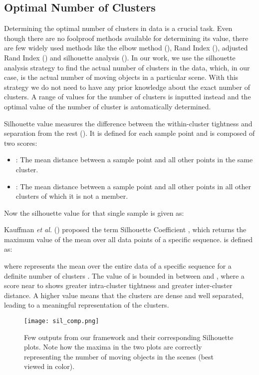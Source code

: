 \documentclass{article}
\begin{document}
\subsection{Optimal Number of Clusters}
Determining the optimal number of clusters in data is a crucial task. Even though there are no foolproof methods available for determining its value, there are few widely used methods like the elbow method (\cite{syakur2018integration}), Rand Index (\cite{santos2009use}), adjusted Rand Index (\cite{hubert1985comparing}) and silhouette analysis (\cite{shutaywi2021silhouette}). In our work, we use the silhouette analysis strategy to find the actual number of clusters in the data, which, in our case, is the actual number of moving objects in a particular scene. With this strategy we do not need to have any prior knowledge about the exact number of clusters. A range of values for the number of clusters is inputted instead and the optimal value of the number of cluster is automatically determined. 

Silhouette value measures the difference between the within-cluster tightness and separation from the rest (\cite{rousseeuw_2002}). It is defined for each sample point and is composed of two scores:
\begin{itemize}[leftmargin=*]
    \itemsep0em
    \item : The mean distance between a sample point  and all other points in the same cluster.
    \item : The mean distance between a sample point  and all other points in all other clusters of which it is not a member.
\end{itemize}
Now the silhouette value  for that single sample is given as:


Kauffman \textit{et al.} (\cite{kaufman_rousseeuw_1990}) proposed the term Silhouette Coefficient , which returns the maximum value of the mean  over all data points of a specific sequence.  is defined as:

where  represents the mean  over the entire data of a specific sequence for a definite number of clusters .   
The value of  is bounded in between  and , where a score near to  shows greater intra-cluster tightness and greater inter-cluster distance. A higher value means that the clusters are dense and well separated, leading to a meaningful representation of the clusters.

\begin{figure}
\begin{center}
\texttt{[image: sil\_comp.png]}
\end{center}
   \caption{Few outputs from our framework and their corresponding Silhouette plots. Note how the maxima in the two plots are correctly representing the number of moving objects in the scenes (best viewed in color).}
    \label{fig:sample and sil plots}
\label{fig:sample and sil plots}
\end{figure}
\end{document}
